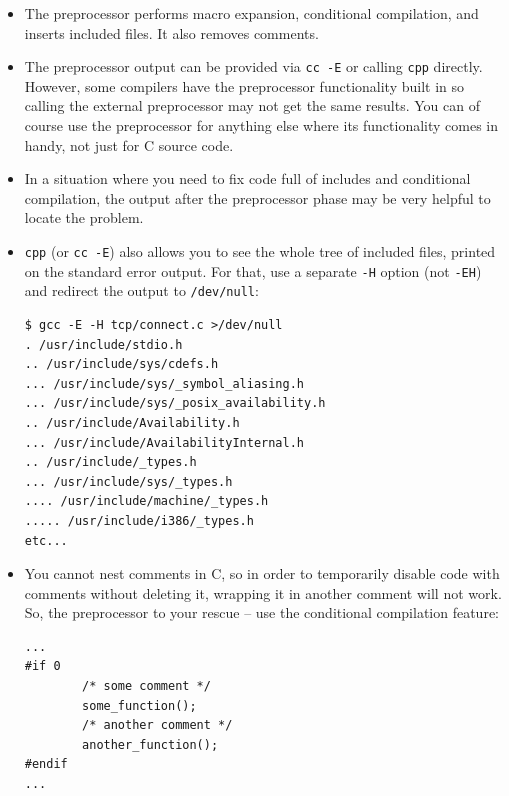 \begin{itemize}
\item The preprocessor performs macro expansion, conditional compilation, and
inserts included files.  It also removes comments.
\item The preprocessor output can be provided via \texttt{cc -E} or calling
\texttt{cpp} directly.  However, some compilers have the preprocessor
functionality built in so calling the external preprocessor may not get the same
results.  You can of course use the preprocessor for anything else where its
functionality comes in handy, not just for C source code.
\item In a situation where you need to fix code full of includes and conditional
compilation, the output after the preprocessor phase may be very helpful to
locate the problem.
\item \texttt{cpp} (or \texttt{cc -E}) also allows you to see the whole tree of
included files, printed on the standard error output.  For that, use a separate
\texttt{-H} option (not \texttt{-EH}) and redirect the output to
\texttt{/dev/null}:

\begin{verbatim}
$ gcc -E -H tcp/connect.c >/dev/null
. /usr/include/stdio.h
.. /usr/include/sys/cdefs.h
... /usr/include/sys/_symbol_aliasing.h
... /usr/include/sys/_posix_availability.h
.. /usr/include/Availability.h
... /usr/include/AvailabilityInternal.h
.. /usr/include/_types.h
... /usr/include/sys/_types.h
.... /usr/include/machine/_types.h
..... /usr/include/i386/_types.h
etc...
\end{verbatim}

\item You cannot nest comments in C, so in order to temporarily disable code with
comments without deleting it, wrapping it in another comment will not work.
So, the preprocessor to your rescue -- use the conditional compilation feature:

\begin{verbatim}
...
#if 0
        /* some comment */
        some_function();
        /* another comment */
        another_function();
#endif
...
\end{verbatim}
\end{itemize}


\begin{slide}
\begin{center}

\end{center}
\end{slide}

